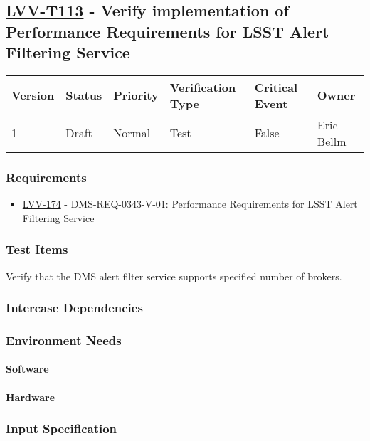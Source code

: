 \subsection{\href{https://jira.lsstcorp.org/secure/Tests.jspa\#/testCase/LVV-T113}{LVV-T113}
    - Verify implementation of Performance Requirements for LSST Alert Filtering Service}\label{lvv-t113}

\begin{longtable}[]{llllll}
\toprule
Version & Status & Priority & Verification Type & Critical Event & Owner
\\\midrule
1 & Draft & Normal &
Test & False & Eric Bellm
\\\bottomrule
\end{longtable}

\subsubsection{Requirements}
\begin{itemize}
\item \href{https://jira.lsstcorp.org/browse/LVV-174}{LVV-174} - DMS-REQ-0343-V-01: Performance Requirements for LSST Alert Filtering Service
\end{itemize}

\subsubsection{Test Items}
Verify that the DMS alert filter service supports specified number of
brokers.



\subsubsection{Intercase Dependencies}

\subsubsection{Environment Needs}

\paragraph{Software}

\paragraph{Hardware}

\subsubsection{Input Specification}


